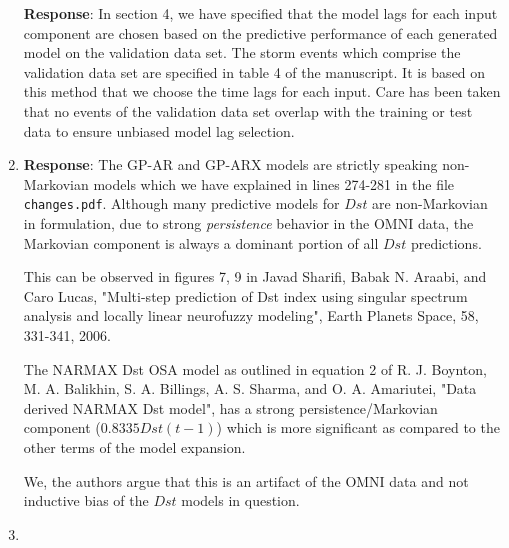 \documentclass{article}
\begin{document}
\begin{enumerate}
{{{}
}

\textbf{Response}: In section 4, we have specified that the model lags for each input component are chosen based on the predictive performance of each generated model on the validation data set. The storm events which comprise the validation data set are specified in table 4 of the manuscript. It is based on this method that we choose the time lags for each input. Care has been taken that no events of the validation data set overlap with the training or test data to ensure unbiased model lag selection.


}

\item{


\textbf{Response}: The GP-AR and GP-ARX models are strictly speaking non-Markovian models which we have explained in lines 274-281 in the file \texttt{changes.pdf}. Although many predictive models for $Dst$ are non-Markovian in formulation, due to strong \emph{persistence} behavior in the OMNI data, the Markovian component is always a dominant portion of all $Dst$ predictions. 

This can be observed in figures 7, 9 in Javad Sharifi, Babak N. Araabi, and Caro Lucas, "Multi-step prediction of Dst index using singular spectrum analysis and locally linear neurofuzzy modeling", Earth Planets Space, 58, 331-341, 2006. 

The NARMAX Dst OSA model as outlined in equation 2 of R. J. Boynton, M. A. Balikhin, S. A. Billings, A. S. Sharma, and O. A. Amariutei, "Data derived NARMAX Dst model", has a strong persistence/Markovian component ($0.8335 Dst(t-1)$) which is more significant as compared to the other terms of the model expansion.

We, the authors argue that this is an artifact of the OMNI data and not inductive bias of the $Dst$ models in question.


}

\item{

}
\end{enumerate}
\end{document}
